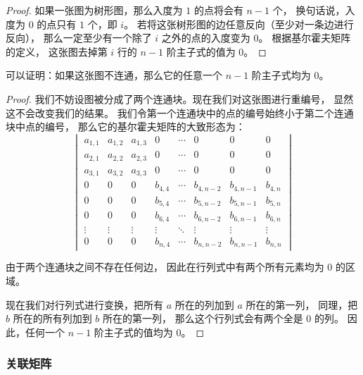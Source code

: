 \documentclass[UTF8]{article}
\newcommand \subsubsubsection [2][4mm]
{
	\vspace{#1}
	{\leftline{\heiti #2}}
	\vspace{2mm}
}
\begin{document}
	\begin{proof}
		如果一张图为树形图，那么入度为 $1$ 的点将会有 $n - 1$ 个，
		换句话说，入度为 $0$ 的点只有 $1$ 个，即 $i$。
		若将这张树形图的边任意反向（至少对一条边进行反向），
		那么一定至少有一个除了 $i$ 之外的点的入度变为 $0$。
		根据基尔霍夫矩阵的定义，
		这张图去掉第 $i$ 行的 $n - 1$ 阶主子式的值为 $0$。
	\end{proof}

	\subsubsubsection{当这张图不连通时}

	可以证明：如果这张图不连通，那么它的任意一个 $n - 1$ 阶主子式均为 $0$。

	\begin{proof}
		我们不妨设图被分成了两个连通块。现在我们对这张图进行重编号，
		显然这不会改变我们的结果。
		我们令第一个连通块中的点的编号始终小于第二个连通块中点的编号，
		那么它的基尔霍夫矩阵的大致形态为：
		\begin{equation*}
			\begin{vmatrix}
				a_{1, 1} & a_{1, 2} & a_{1, 3} & 0 & \cdots & 0 & 0 & 0
				\\
				a_{2, 1} & a_{2, 2} & a_{2, 3} & 0 & \cdots & 0 & 0 & 0
				\\
				a_{3, 1} & a_{3, 2} & a_{3, 3} & 0 & \cdots & 0 & 0 & 0
				\\
				0 & 0 & 0 & b_{4, 4} & \cdots & b_{4, n - 2} & b_{4, n - 1} & b_{4, n}
				\\
				0 & 0 & 0 & b_{5, 4} & \cdots & b_{5, n - 2} & b_{5, n - 1} & b_{5, n}
				\\
				0 & 0 & 0 & b_{6, 4} & \cdots & b_{6, n - 2} & b_{6, n - 1} & b_{6, n}
				\\
				\vdots & \vdots & \vdots & \vdots & \ddots &  \vdots & \vdots & \vdots
				\\
				0 & 0 & 0 & b_{n, 4} & \cdots & b_{n, n - 2} & b_{n, n - 1} & b_{n, n}
			\end{vmatrix}
		\end{equation*}

		由于两个连通块之间不存在任何边，
		因此在行列式中有两个所有元素均为 $0$ 的区域。

		现在我们对行列式进行变换，把所有 $a$ 所在的列加到 $a$ 所在的第一列，
		同理，把 $b$ 所在的所有列加到 $b$ 所在的第一列，
		那么这个行列式会有两个全是 $0$ 的列。
		因此，任何一个 $n - 1$ 阶主子式的值均为 $0$。
	\end{proof}

	\subsubsection{关联矩阵}
\end{document}

